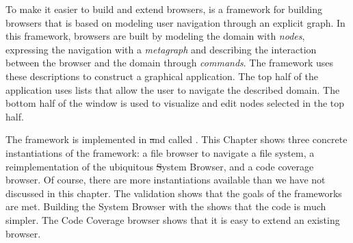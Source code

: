 \documentclass[a4paper,10pt,twoside]{book}
\begin{document}
To make it easier to build and extend browsers, \ob is a framework for building browsers that is based on modeling user navigation through an explicit graph.
In this framework, browsers are built by modeling the domain with \emph{nodes}, expressing the navigation with a \emph{metagraph} and describing the interaction between the browser and the domain through \emph{commands}. 
The framework uses these descriptions to construct a graphical application. The top half of the application uses lists that allow the user to navigate the described domain. The bottom half of the window is used to visualize and edit nodes selected in the top half.

The framework is implemented in \pharo \st and called \ob.
This Chapter shows three concrete instantiations of the framework: a file browser to navigate a file system, a reimplementation of the ubiquitous \st System Browser, and a code coverage browser.
Of course, there are more instantiations available than we have not discussed in this chapter.
The validation shows that the goals of the frameworks are met. Building the System Browser with the \obf shows that the code is much simpler. The Code Coverage browser shows that it is easy to extend an existing browser.









\ifx\wholebook\relax\else
   
   
\end{document}
